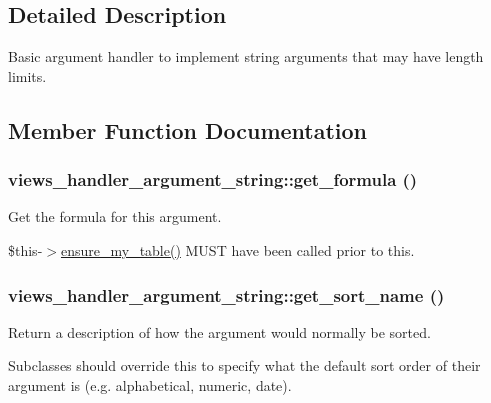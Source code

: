 \subsection{Detailed Description}
Basic argument handler to implement string arguments that may have length limits. 

\subsection{Member Function Documentation}
\hypertarget{classviews__handler__argument__string_a8c039cb85ad264fd03ff5cdef379dfb5}{
\subsubsection[{get\_\-formula}]{\setlength{\rightskip}{0pt plus 5cm}views\_\-handler\_\-argument\_\-string::get\_\-formula ()}}
\label{classviews__handler__argument__string_a8c039cb85ad264fd03ff5cdef379dfb5}
Get the formula for this argument.

\$this-\/$>$\hyperlink{classviews__handler_a947f21ef0f21a77f4d103af4702b3600}{ensure\_\-my\_\-table()} MUST have been called prior to this. \hypertarget{classviews__handler__argument__string_a7f17c1b9687f36572d9dd2dee95002de}{
\subsubsection[{get\_\-sort\_\-name}]{\setlength{\rightskip}{0pt plus 5cm}views\_\-handler\_\-argument\_\-string::get\_\-sort\_\-name ()}}
\label{classviews__handler__argument__string_a7f17c1b9687f36572d9dd2dee95002de}
Return a description of how the argument would normally be sorted.

Subclasses should override this to specify what the default sort order of their argument is (e.g. alphabetical, numeric, date). 

